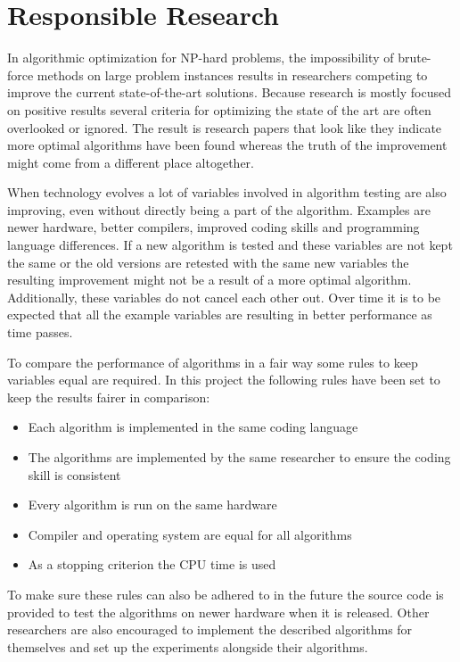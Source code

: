 \section{Responsible Research}
In algorithmic optimization for NP-hard problems, the impossibility of brute-force methods on large problem instances results in researchers competing to improve the current state-of-the-art solutions. Because research is mostly focused on positive results several criteria for optimizing the state of the art are often overlooked or ignored. The result is research papers that look like they indicate more optimal algorithms have been found whereas the truth of the improvement might come from a different place altogether.

When technology evolves a lot of variables involved in algorithm testing are also improving, even without directly being a part of the algorithm. Examples are newer hardware, better compilers, improved coding skills and programming language differences. If a new algorithm is tested and these variables are not kept the same or the old versions are retested with the same new variables the resulting improvement might not be a result of a more optimal algorithm. Additionally, these variables do not cancel each other out. Over time it is to be expected that all the example variables are resulting in better performance as time passes.

To compare the performance of algorithms in a fair way some rules to keep variables equal are required. In this project the following rules have been set to keep the results fairer in comparison: 
\begin{itemize}
\item Each algorithm is implemented in the same coding language
\item The algorithms are implemented by the same researcher to ensure the coding skill is consistent
\item Every algorithm is run on the same hardware
\item Compiler and operating system are equal for all algorithms
\item As a stopping criterion the CPU time is used
\end{itemize}
To make sure these rules can also be adhered to in the future the source code is provided to test the algorithms on newer hardware when it is released. Other researchers are also encouraged to implement the described algorithms for themselves and set up the experiments alongside their algorithms.


